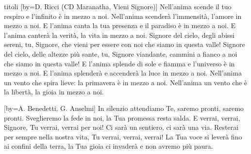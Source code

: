 \begin{songs}{titoli}
[by={D. Ricci (CD Maranatha, Vieni Signore)}]
\beginverse
Nell'anima scende il tuo respiro e l'infinito è in mezzo a noi.
Nell'anima scenderà l'immensità, l'amore in mezzo a noi.
E l'anima canta la tua presenza e il paradiso è in mezzo a noi.
E l'anima canterà la verità, la vita in mezzo a noi.
\endverse
\beginchorus
Signore del cielo, degli abissi sereni,
tu, Signore, che vieni per essere con noi che siamo in questa valle!
Signore del cielo, delle altezze più sante,
tu, Signore viandante, cammini a fianco a noi che siamo in questa valle!
\endchorus
\beginverse
E l'anima splende di sole e fiamma e l'universo è in mezzo a noi.
E l'anima splenderà e accenderà la luce in mezzo a noi.
\endverse
\beginverse
Nell'anima un vento che spira lieve: la primavera è in mezzo a noi.
Nell'anima un vento che è la libertà, la gioia in mezzo a noi.
\endverse
\endsong

[by={A. Benedetti, G. Anselmi}]
\beginverse
In silenzio attendiamo Te,
saremo pronti, saremo pronti.
Sveglieremo la fede in noi,
la Tua promessa resta salda.
\endverse
\beginchorus
E verrai, verrai, Signore,
Tu verrai, verrai per noi!
Ci sarà un sentiero, ci sarà una via.
Resterai per sempre nella nostra vita,
Tu verrai, verrai, verrai!
\endchorus
\beginverse
La Tua voce si leverà
fino ai confini della terra,
la Tua gioia ci invaderà
e non avremo più paura.
\endverse
\endsong


\end{songs}
